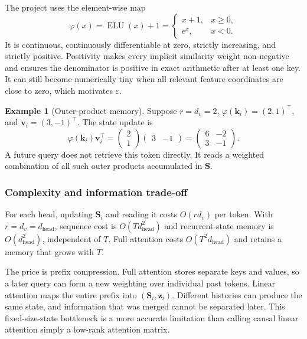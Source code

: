 \documentclass[11pt,a4paper]{article}
\theoremstyle{definition}
\newtheorem{example}{Example}[section]
\theoremstyle{plain}
\newcommand{\vk}{\bm{k}}
\newcommand{\vv}{\bm{v}}
\newcommand{\vz}{\bm{z}}
\newcommand{\mS}{\bm{S}}
\newcommand{\dhead}{d_{\mathrm{head}}}
\DeclareMathOperator{\ELU}{ELU}
\begin{document}
The project uses the element-wise map
\begin{equation}\label{eq:elu-plus-one}
    \varphi(x)=\ELU(x)+1
    =\begin{cases}
        x+1, & x\geq0,\\
        e^x, & x<0.
      \end{cases}
\end{equation}
It is continuous, continuously differentiable at zero, strictly increasing, and strictly positive. Positivity makes every implicit similarity weight non-negative and ensures the denominator is positive in exact arithmetic after at least one key. It can still become numerically tiny when all relevant feature coordinates are close to zero, which motivates $\varepsilon$.

\begin{example}[Outer-product memory]
Suppose $r=d_v=2$, $\varphi(\vk_i)=(2,1)^\top$, and $\vv_i=(3,-1)^\top$. The state update is
\begin{equation}
    \varphi(\vk_i)\vv_i^\top
    =\begin{pmatrix}2\\1\end{pmatrix}
     \begin{pmatrix}3&-1\end{pmatrix}
    =\begin{pmatrix}6&-2\\3&-1\end{pmatrix}.
\end{equation}
A future query does not retrieve this token directly. It reads a weighted combination of all such outer products accumulated in $\mS$.
\end{example}

\subsubsection{Complexity and information trade-off}

For each head, updating $\mS_i$ and reading it costs $O(rd_v)$ per token. With $r=d_v=\dhead$, sequence cost is $O(T\dhead^2)$ and recurrent-state memory is $O(\dhead^2)$, independent of $T$. Full attention costs $O(T^2\dhead)$ and retains a memory that grows with $T$.

The price is prefix compression. Full attention stores separate keys and values, so a later query can form a new weighting over individual past tokens. Linear attention maps the entire prefix into $(\mS_i,\vz_i)$. Different histories can produce the same state, and information that was merged cannot be separated later. This fixed-size-state bottleneck is a more accurate limitation than calling causal linear attention simply a low-rank attention matrix.
\end{document}
